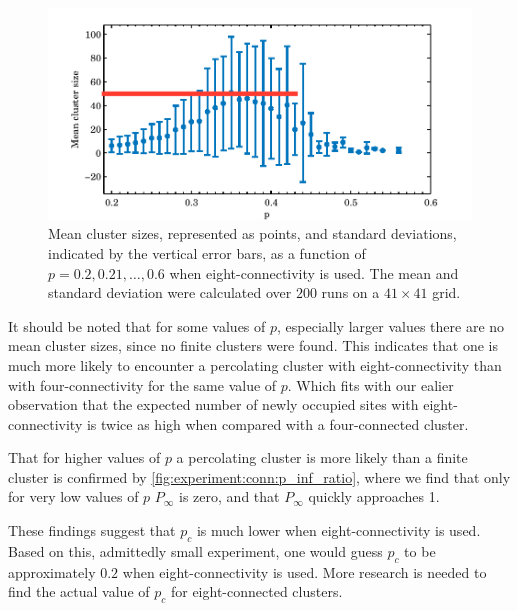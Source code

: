 \begin{figure}
	\centering
	\includegraphics[width=\textwidth]{./img/assignment_d_mean_std_p.pdf}
	\caption{Mean cluster sizes, represented as points, and standard deviations, indicated by the vertical error bars, as a function of $p = 0.2, 0.21, \dotsc, 0.6$ when eight-connectivity is used. The mean and standard deviation were calculated over $200$ runs on a $41 \times 41$ grid.}
	\label{fig:experiment:conn:mean_std_clusters}
\end{figure}

It should be noted that for some values of $p$, especially larger values there are no mean cluster sizes, since no finite clusters were found. This indicates that one is much more likely to encounter a percolating cluster with eight-connectivity than with four-connectivity for the same value of $p$. Which fits with our ealier observation that the expected number of newly occupied sites with eight-connectivity is twice as high when compared with a four-connected cluster.

That for higher values of $p$ a percolating cluster is more likely than a finite cluster is confirmed by \cref{fig:experiment:conn:p_inf_ratio}, where we find that only for very low values of $p$ $P_\infty$ is zero, and that $P_\infty$ quickly approaches 1. 

These findings suggest that $p_c$ is much lower when eight-connectivity is used. Based on this, admittedly small experiment, one would guess $p_c$ to be approximately $0.2$ when eight-connectivity is used. More research is needed to find the actual value of $p_c$ for eight-connected clusters.\\








